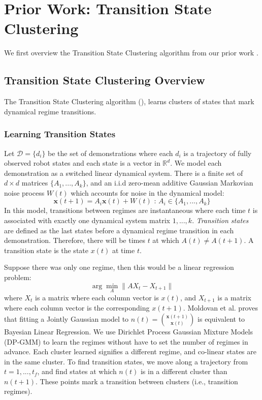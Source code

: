 \documentclass[0-main.tex]{subfiles}
\begin{document}
\section{Prior Work: Transition State Clustering}

We first overview the Transition State Clustering algorithm from our prior work \cite{krishnan2015tsc}.

\subsection{Transition State Clustering Overview}
The Transition State Clustering algorithm (\sys), learns clusters of states that mark dynamical regime transitions.

\subsubsection{Learning Transition States}
Let $\mathcal{D}=\{d_i\}$ be the set of demonstrations where each $d_i$ is a trajectory of fully observed robot states and each state is a vector in $\mathbb{R}^d$.
We model each demonstration as a switched linear dynamical system.
There is a finite set of $d \times d$ matrices $\{A_1,...,A_k\}$, and an i.i.d zero-mean additive Gaussian Markovian noise process $W(t)$ which accounts for noise in the dynamical model:
\vspace{-3pt}
\[
\mathbf{x}(t+1) = A_{i}\mathbf{x}(t) + W(t) \text{ : } A_i \in \{A_1,...,A_k\}
\]
In this model, transitions between regimes are instantaneous where each time $t$ is associated with exactly one dynamical system matrix $1,...,k$.
\emph{Transition states} are defined as the last states before a dynamical regime transition in each demonstration.
Therefore, there will be times $t$ at which $A(t) \ne A(t+1)$.
A transition state is the state $x(t)$ at time $t$.

Suppose there was only one regime, then this would be a linear regression problem:
\vspace{-3pt}
\[
\arg\min_A \|A X_t - X_{t+1}\|
\]
where $X_t$ is a matrix where each column vector is $x(t)$, and $X_{t+1}$ is a matrix where each column vector is the corresponding $x(t+1)$.
Moldovan et al. \cite{moldovan2013dirichlet} proves that fitting a Jointly Gaussian model to $n(t) = \binom{\mathbf{x}(t+1)}{\mathbf{x}(t)}$ is equivalent to Bayesian Linear Regression.
We use Dirichlet Process Gaussian Mixture Models (DP-GMM) to learn the regimes without have to set the number of regimes in advance.
Each cluster learned signifies a different regime, and co-linear states are in the same cluster.
To find transition states, we move along a trajectory from $t=1,...,t_f$, and find states at which $n(t)$ is in a different cluster than $n(t+1)$.
These points mark a transition between clusters (i.e., transition regimes).
\end{document}
